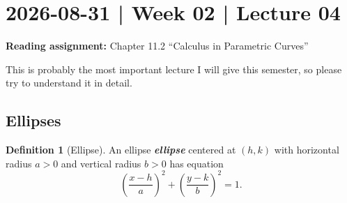 \documentclass[10pt]{article}
\DeclareRobustCommand{\demph}[1]{%
  \ifmmode
  {\color{Blue}#1}%
  \else
  {\color{Blue}\bfseries\slshape #1}%
  \fi
}
\theoremstyle{definition}
\newtheorem{definition}[theorem]{Definition}
\newcommand{\1}[1]{\textbf{1}_{\left[#1\right]}} %
\begin{document}
\section{2026-08-31 | Week 02 | Lecture 04}
\textbf{Reading assignment:} Chapter 11.2 ``Calculus in Parametric Curves''

This is probably the most important lecture I will give this semester, so
please try to understand it in detail.

\subsection{Ellipses}
\begin{definition}[Ellipse]
  An \demph{ellipse} centered at $(h,k)$ with horizontal radius $a>0$ and vertical
  radius $b>0$ has equation
  \begin{equation*}
    \left( \frac{x-h}{a} \right) ^2+\left( \frac{y-k}{b} \right)^2=1.
  \end{equation*}
\end{definition}
\end{document}
